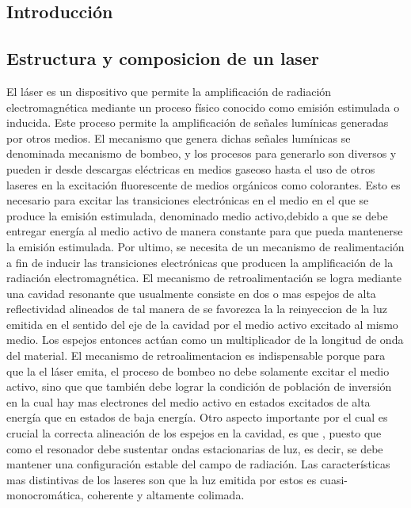 \documentclass[10pt, a4paper]{article}%
\begin{document}
\begin{multicols}{2} %
\tableofcontents %

\section{Introducción}

\subsection{Estructura y composicion de un laser}

El láser es un dispositivo que permite la amplificación de radiación electromagnética mediante un proceso físico conocido como emisión estimulada o inducida. Este proceso permite la amplificación de señales lumínicas generadas por otros medios. El mecanismo que genera dichas señales lumínicas se denominada mecanismo de bombeo, y los procesos para generarlo son diversos y pueden ir desde descargas eléctricas en medios gaseoso hasta el uso de otros laseres en la excitación fluorescente de medios orgánicos como colorantes. Esto es necesario para excitar las transiciones electrónicas en el medio en el que se produce la emisión estimulada, denominado medio activo,debido a que se debe entregar energía al medio activo de manera constante para que pueda mantenerse la emisión estimulada. Por ultimo, se necesita de un mecanismo de realimentación a fin de inducir las transiciones electrónicas que producen la amplificación de la radiación electromagnética. El mecanismo de retroalimentación se logra mediante una cavidad resonante que usualmente consiste en dos o mas espejos de alta reflectividad alineados de tal manera de se favorezca la la reinyeccion de la luz emitida en el sentido del eje de la cavidad por el medio activo excitado al mismo medio. Los espejos entonces actúan como un multiplicador de la longitud de onda del material. El mecanismo de retroalimentacion es indispensable porque para que la el láser emita, el proceso de bombeo no debe solamente excitar el medio activo, sino que que también debe lograr la condición de población de inversión en la cual hay mas electrones del medio activo en estados excitados de alta energía que en estados de baja energía.
Otro aspecto importante por el cual es crucial la correcta alineación de los espejos en la cavidad, es que , puesto que como el resonador debe sustentar ondas estacionarias de luz, es decir, se debe mantener una configuración estable del campo de radiación.
\newline
Las características mas distintivas de los laseres son que la luz emitida por estos es cuasi-monocromática, coherente y altamente colimada.


\end{multicols}
\end{document}
